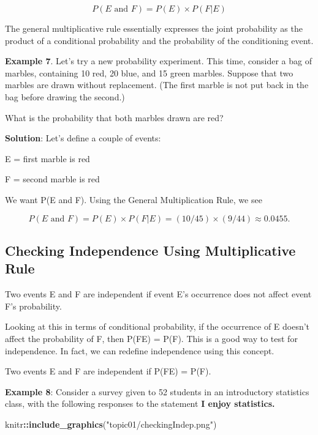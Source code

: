 \documentclass[
]{book}
\newenvironment{Shaded}{\begin{snugshade}}{\end{snugshade}}
\newcommand{\FunctionTok}[1]{\textcolor[rgb]{0.13,0.29,0.53}{\textbf{#1}}}
\newcommand{\NormalTok}[1]{#1}
\newcommand{\SpecialCharTok}[1]{\textcolor[rgb]{0.81,0.36,0.00}{\textbf{#1}}}
\newcommand{\StringTok}[1]{\textcolor[rgb]{0.31,0.60,0.02}{#1}}
\begin{document}
\[P(E \mbox{ and } F) = P(E) \times P(F|E)\]

The general multiplicative rule essentially expresses the joint probability as the product of a conditional probability and the probability of the conditioning event.

\textbf{Example 7}. Let's try a new probability experiment. This time, consider a bag of marbles, containing 10 red, 20 blue, and 15 green marbles. Suppose that two marbles are drawn without replacement. (The first marble is not put back in the bag before drawing the second.)

What is the probability that both marbles drawn are red?

\textbf{Solution}: Let's define a couple of events:

E = first marble is red

F = second marble is red

We want P(E and F). Using the General Multiplication Rule, we see

\[P(E \mbox{ and } F) = P(E)  \times P(F|E) = (10/45) \times (9/44) \approx 0.0455.\]

\hypertarget{checking-independence-using-multiplicative-rule}{%
\subsection{Checking Independence Using Multiplicative Rule}\label{checking-independence-using-multiplicative-rule}}

Two events E and F are independent if event E's occurrence does not affect event F's probability.

Looking at this in terms of conditional probability, if the occurrence of E doesn't affect the probability of F, then P(F\textbar E) = P(F). This is a good way to test for independence. In fact, we can redefine independence using this concept.

Two events E and F are independent if P(F\textbar E) = P(F).

\textbf{Example 8}: Consider a survey given to 52 students in an introductory statistics class, with the following responses to the statement \textbf{I enjoy statistics.}

\begin{Shaded}
\begin{Highlighting}[]
\NormalTok{knitr}\SpecialCharTok{::}\FunctionTok{include\_graphics}\NormalTok{(}\StringTok{"topic01/checkingIndep.png"}\NormalTok{)}
\end{Highlighting}
\end{Shaded}
\end{document}
